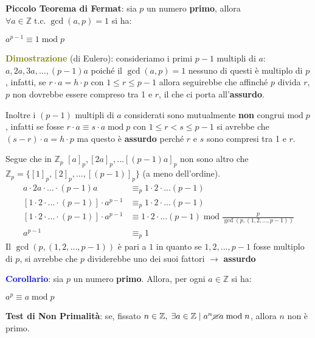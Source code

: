 \newpage
\begin{flushleft}
    \textbf{Piccolo Teorema di Fermat}: sia $p$ un numero \textbf{primo}, allora $\forall a \in \mathbb{Z} \; \text{t.c.} \; \gcd (a, p) = 1$ si ha:

    {\centering
        $a^{p - 1} \equiv 1 \; \text{mod} \; p$
    \par}
    \begin{boxA}
        \textcolor{olive}{\textbf{Dimostrazione}} (di Eulero): consideriamo i primi $p - 1$ multipli di $a$: $a, 2a, 3a, ..., (p - 1)a$ poiché il $\gcd (a, p) = 1$ nessuno di questi è multiplo di $p$, infatti, se $r \cdot a = h \cdot p$ con $1 \leq r \leq p - 1$ allora seguirebbe che affinché $p$ divida $r$, $p$ non dovrebbe essere compreso tra 1 e $r$, il che ci porta all'\textbf{assurdo}. 
        
        Inoltre i $(p - 1)$ multipli di $a$ considerati sono mutualmente \textbf{non} congrui $\text{mod} \; p$, infatti se fosse $r \cdot a \equiv s \cdot a \; \text{mod} \; p$ con $1 \leq r < s \leq p - 1$ si avrebbe che $(s - r) \cdot a = h \cdot p$ ma questo è \textbf{assurdo} perché $r$ e $s$ sono compresi tra 1 e $r$.

        Segue che in $\mathbb{Z}_p$ $[a]_p, [2a]_p, ...[(p-1)a]_p$ non sono altro che $\mathbb{Z}_p = \{[1]_p, [2]_p, ..., [(p-1)]_p\}$ (a meno dell'ordine).
        \begin{align*}
            a \cdot 2a \cdot ... \cdot (p - 1)a &\equiv_p 1 \cdot 2 \cdot ... (p - 1) \\
            [1 \cdot 2 \cdot ... \cdot (p - 1)] \cdot a^{p - 1} &\equiv_p 1 \cdot 2 \cdot ... (p - 1) \\
            [1 \cdot 2 \cdot ... \cdot (p - 1)] \cdot a^{p - 1} &\equiv 1 \cdot 2 \cdot ... (p - 1) \; \text{mod} \; \frac{p}{\gcd (p, (1, 2, ..., p - 1))} \\
            a^{p - 1} &\equiv_p 1
        \end{align*}
        Il $\gcd (p, (1, 2, ..., p - 1))$ è pari a $1$ in quanto se $1, 2, ..., p - 1$ fosse multiplo di $p$, si avrebbe che $p$ dividerebbe uno dei suoi fattori $\rightarrow$ \textbf{assurdo}
    \end{boxA}
    \textcolor{blue}{\textbf{Corollario}}: sia $p$ un numero \textbf{primo}. Allora, per ogni $a \in \mathbb{Z}$ si ha:

    {\centering
        $a^p \equiv a \; \text{mod} \; p$
    \par}

    \textbf{Test di Non Primalità}: se, fissato $n \in \mathbb{Z}, \; \exists a \in \mathbb{Z} \; | \; a^n \cancel{\equiv} a \; \text{mod} \; n$, allora $n$ non è primo.
\end{flushleft}